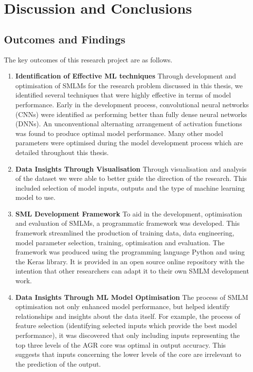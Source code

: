 \chapter{Discussion and Conclusions}

\section{Outcomes and Findings}

The key outcomes of this research project are as follows.

\begin{enumerate}
	\item \textbf{Identification of Effective ML techniques}
	Through development and optimisation of SMLMs for the research problem discussed in this thesis, we identified several techniques that were  highly effective in terms of model performance. Early in the development process, convolutional neural networks (CNNs) were identified as performing better than fully dense neural networks (DNNs). An unconventional alternating arrangement of activation functions was found to produce optimal model performance. Many other model parameters were optimised during the model development process which are detailed throughout this thesis.
	
	
	\item \textbf{Data Insights Through Visualisation} Through visualisation and analysis of the dataset we were able to better guide the direction of the research. This included selection of model inputs, outputs and the type of machine learning model to use.
	
	
	\item \textbf{SML Development Framework}  To aid in the development, optimisation and evaluation of SMLMs, a programmatic framework was developed. This framework streamlined the production of training data, data engineering, model parameter selection, training, optimisation and evaluation. The framework was produced using the programming language Python and using the Keras library. It is provided in an open source online repository with the intention that other researchers can adapt it to their own SMLM development work.
	
	\item \textbf{Data Insights Through ML Model Optimisation}
	The process of SMLM optimisation not only enhanced model performance, but helped identify relationships and insights about the data itself. For example, the process of feature selection (identifying selected inputs which provide the best model performance), it was discovered that only including inputs representing the top three levels of the AGR core was optimal in output accuracy. This suggests that inputs concerning the lower levels of the core are irrelevant to the prediction of the output.  
	

\end{enumerate}
